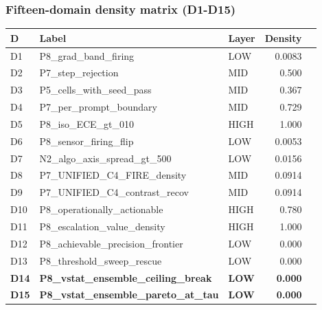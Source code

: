 \documentclass{article}
\begin{document}
\subsubsection{Fifteen-domain density matrix (D1-D15)}
\begin{tabular}{lllrr}
\hline
\textbf{D} & \textbf{Label} & \textbf{Layer} & \textbf{Density} \\
\hline
D1  & P8\_grad\_band\_firing            & LOW  & 0.0083 \\
D2  & P7\_step\_rejection              & MID  & 0.500 \\
D3  & P5\_cells\_with\_seed\_pass      & MID  & 0.367 \\
D4  & P7\_per\_prompt\_boundary        & MID  & 0.729 \\
D5  & P8\_iso\_ECE\_gt\_010            & HIGH & 1.000 \\
D6  & P8\_sensor\_firing\_flip         & LOW  & 0.0053 \\
D7  & N2\_algo\_axis\_spread\_gt\_500  & LOW  & 0.0156 \\
D8  & P7\_UNIFIED\_C4\_FIRE\_density  & MID  & 0.0914 \\
D9  & P7\_UNIFIED\_C4\_contrast\_recov & MID & 0.0914 \\
D10 & P8\_operationally\_actionable    & HIGH & 0.780 \\
D11 & P8\_escalation\_value\_density   & HIGH & 1.000 \\
D12 & P8\_achievable\_precision\_frontier & LOW & 0.000 \\
D13 & P8\_threshold\_sweep\_rescue     & LOW  & 0.000 \\
\textbf{D14} & \textbf{P8\_vstat\_ensemble\_ceiling\_break} & \textbf{LOW} & \textbf{0.000} \\
\textbf{D15} & \textbf{P8\_vstat\_ensemble\_pareto\_at\_tau} & \textbf{LOW} & \textbf{0.000} \\
\hline
\end{tabular}
\end{document}
